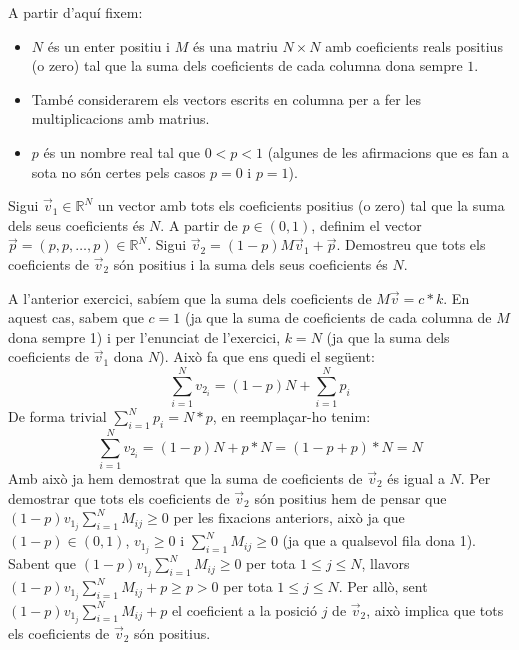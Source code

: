 \documentclass[a4paper, 12pt]{article}
\begin{document}
    \noindent A partir d'aquí fixem:
    \begin{itemize}
        \item $N$ és un enter positiu i $M$ és una matriu $N \times N$ amb coeficients reals positius
        (o zero) tal que la suma dels coeficients de cada columna dona sempre $1$.
        \item També considerarem els vectors escrits en columna per a fer les multiplicacions amb
        matrius.
        \item $p$ és un nombre real tal que $0 < p < 1$ (algunes de les afirmacions que es fan a sota
        no són certes pels casos $p = 0$ i $p = 1$).
    \end{itemize}
    
    \begin{exercici}
        Sigui $\vec{v}_1 \in \mathbb{R}^N$ un vector amb tots els coeficients positius (o zero) tal que
        la suma dels seus coeficients és $N$. A partir de $p \in (0, 1)$, definim el vector $\vec{p} = (p, p, \dots, p) \in \mathbb{R}^N$.
        Sigui $\vec{v}_2 = (1 - p)M\vec{v}_1 + \vec{p}$. Demostreu que tots els coeficients de $\vec{v}_2$
        són positius i la suma dels seus coeficients és $N$. 
    \end{exercici}
    \begin{solucio}
        A l'anterior exercici, sabíem que la suma dels coeficients de $M\vec{v} = c*k$. En aquest cas,
        sabem que $c = 1$ (ja que la suma de coeficients de cada columna de $M$ dona sempre 1) i per
        l'enunciat de l'exercici, $k = N$ (ja que la suma dels coeficients de $\vec{v}_1$ dona $N$).
        Això fa que ens quedi el següent:
        \begin{displaymath}
            \sum_{i=1}^{N} v_{2_i} = (1-p)N+\sum_{i=1}^{N}p_i
        \end{displaymath}
        De forma trivial $\sum_{i=1}^{N}p_i = N*p$, en reemplaçar-ho tenim:
        \begin{displaymath}
            \sum_{i=1}^{N} v_{2_i} = (1-p)N+p*N = (1-p+p)*N = N
        \end{displaymath}
        Amb això ja hem demostrat que la suma de coeficients de $\vec{v}_2$ és igual a $N$.
        Per demostrar que tots els coeficients de $\vec{v}_2$ són positius hem de pensar que $(1 - p) v_{1_j} \sum_{i=1}^{N}M_{ij} \geq 0$
        per les fixacions anteriors, això ja que $(1 - p) \in (0, 1)$, $v_{1_j} \geq 0$ i $\sum_{i=1}^{N}M_{ij} \geq 0$
        (ja que a qualsevol fila dona 1).\\
        Sabent que $(1 - p) v_{1_j} \sum_{i=1}^{N}M_{ij} \geq 0$ per tota $1 \leq j \leq N$, llavors $(1 - p) v_{1_j} \sum_{i=1}^{N}M_{ij} + p \geq p > 0$
        per tota $1 \leq j \leq N$. Per allò, sent $(1 - p) v_{1_j} \sum_{i=1}^{N}M_{ij} + p$ el
        coeficient a la posició $j$ de $\vec{v}_2$, això implica que tots els coeficients de $\vec{v}_2$
        són positius.
    \end{solucio}
    
\end{document}
